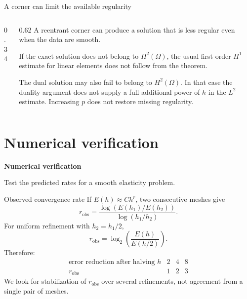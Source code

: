 \documentclass[11pt,aspectratio=169]{beamer}
\newcommand{\Om}{\Omega}
\begin{document}
\begin{frame}{A corner can limit the available regularity}
\begin{columns}[T,onlytextwidth]
  \begin{column}{0.34\textwidth}
    \centering
  \end{column}
  \begin{column}{0.62\textwidth}
    A reentrant corner can produce a solution that is less regular even when
    the data are smooth.
    \vspace{0.1cm}

    If the exact solution does not belong to $H^2(\Om)$, the usual
    first-order $H^1$ estimate for linear elements does not follow from the
    theorem.
    \vspace{0.25cm}

    The dual solution may also fail to belong to $H^2(\Om)$. In that case the
    duality argument does not supply a full additional power of $h$ in the
    $L^2$ estimate. Increasing $p$ does not restore missing regularity.
  \end{column}
\end{columns}
\end{frame}

\section{Numerical verification}

\begin{frame}[plain]
  \centering\vfill
  {\LARGE\bfseries Numerical verification\par}
  \vspace{0.45cm}
  {\large Test the predicted rates for a smooth elasticity problem.\par}
  \vfill
\end{frame}

\begin{frame}{Observed convergence rate}
If $E(h)\approx Ch^r$, two consecutive meshes give
\[
  \boxed{r_{\mathrm{obs}}
  =\frac{\log(E(h_1)/E(h_2))}{\log(h_1/h_2)}.}
\]
For uniform refinement with $h_2=h_1/2$,
\[
  r_{\mathrm{obs}}=\log_2\!\left(\frac{E(h)}{E(h/2)}\right).
\]
Therefore:
\[
\begin{array}{c|ccc}
  \text{error reduction after halving }h & 2 & 4 & 8\\ \hline
  r_{\mathrm{obs}} & 1 & 2 & 3
\end{array}
\]
We look for stabilization of $r_{\mathrm{obs}}$ over several refinements,
not agreement from a single pair of meshes.
\end{frame}
\end{document}
